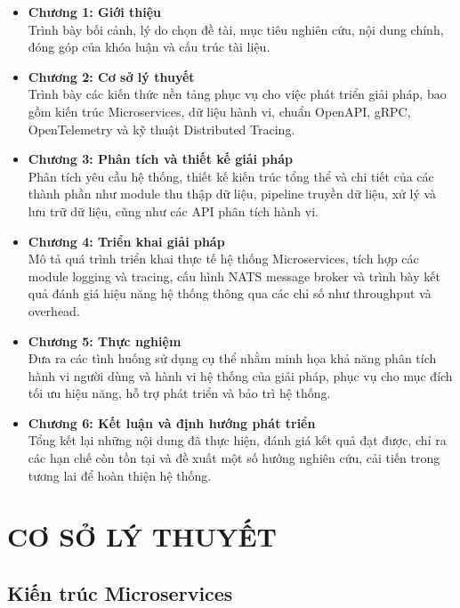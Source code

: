 \documentclass{uetgraduation}
\begin{document}
\begin{itemize}
    \item \textbf{Chương 1: Giới thiệu} \\
    Trình bày bối cảnh, lý do chọn đề tài, mục tiêu nghiên cứu, nội dung chính, đóng góp của khóa luận và cấu trúc tài liệu.

    \item \textbf{Chương 2: Cơ sở lý thuyết} \\
    Trình bày các kiến thức nền tảng phục vụ cho việc phát triển giải pháp, bao gồm kiến trúc Microservices, dữ liệu hành vi, chuẩn OpenAPI, gRPC, OpenTelemetry và kỹ thuật Distributed Tracing.

    \item \textbf{Chương 3: Phân tích và thiết kế giải pháp} \\
    Phân tích yêu cầu hệ thống, thiết kế kiến trúc tổng thể và chi tiết của các thành phần như module thu thập dữ liệu, pipeline truyền dữ liệu, xử lý và lưu trữ dữ liệu, cũng như các API phân tích hành vi.

    \item \textbf{Chương 4: Triển khai giải pháp} \\
    Mô tả quá trình triển khai thực tế hệ thống Microservices, tích hợp các module logging và tracing, cấu hình NATS message broker và trình bày kết quả đánh giá hiệu năng hệ thống thông qua các chỉ số như throughput và overhead.

    \item \textbf{Chương 5: Thực nghiệm} \\
    Đưa ra các tình huống sử dụng cụ thể nhằm minh họa khả năng phân tích hành vi người dùng và hành vi hệ thống của giải pháp, phục vụ cho mục đích tối ưu hiệu năng, hỗ trợ phát triển và bảo trì hệ thống.

    \item \textbf{Chương 6: Kết luận và định hướng phát triển} \\
    Tổng kết lại những nội dung đã thực hiện, đánh giá kết quả đạt được, chỉ ra các hạn chế còn tồn tại và đề xuất một số hướng nghiên cứu, cải tiến trong tương lai để hoàn thiện hệ thống.
\end{itemize}


	\chapter{CƠ SỞ LÝ THUYẾT}
\section{Kiến trúc Microservices}
\end{document}
